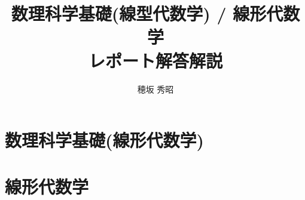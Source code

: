 \documentclass{jsbook}
\begin{document}
\frontmatter

\title{数理科学基礎(線型代数学) / 線形代数学\\レポート解答解説}
\author{穂坂 秀昭}

\maketitle

\tableofcontents

\mainmatter

\part{数理科学基礎(線形代数学)}\label{part1}



\part{線形代数学}\label{part2}	%
\end{document}
